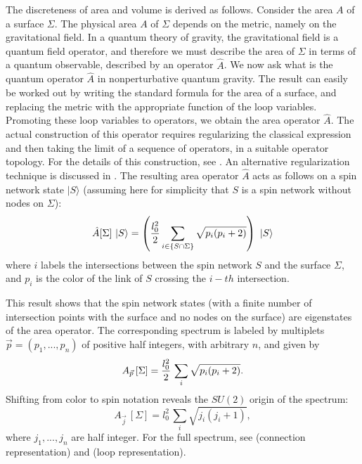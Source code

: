 \documentclass[12pt]{article}
\begin{document}
\begin{itemize}
\begin{itemize}
\end{itemize}

 The discreteness of area and volume is derived as follows.  Consider 
 the area $A$ of a surface $\Sigma$.  The physical area $A$ of 
 $\Sigma$ depends on the metric, namely on the gravitational field.  
 In a quantum theory of gravity, the gravitational field is a quantum 
 field operator, and therefore we must describe the area of $\Sigma$ 
 in terms of a quantum observable, described by an operator $\hat A$.  
 We now ask what is the quantum operator $\hat A$ in nonperturbative 
 quantum gravity.  The result can easily be worked out by writing the 
 standard formula for the area of a surface, and replacing the metric 
 with the appropriate function of the loop variables.  Promoting these 
 loop variables to operators, we obtain the area operator $\hat A$.  
 The actual construction of this operator requires regularizing the 
 classical expression and then taking the limit of a sequence of 
 operators, in a suitable operator topology.  For the details of this 
 construction, see 
 \cite{RovelliSmolin95,DePietriRovelli,FrittelliEtAl,BorissovEtAl97}.  
 An alternative regularization technique is discussed in 
 \cite{AshtekarLewandowskiArea2}.  The resulting area operator $\hat 
 A$ acts as follows on a spin network state $|S\rangle$ (assuming here 
 for simplicity that $S$ is a spin network without nodes on $\Sigma$):
\begin{equation}
\hat{A}[\Sigma]\ |S\rangle=
\left({l^2_0\over 2} \sum_{i\in\{S\cap\Sigma\}}
\sqrt{p_i(p_i+2)}\right) \  |S\rangle
\end{equation}
where $i$ labels the intersections between the spin network $S$ 
and the surface $\Sigma$, and $p_{i}$ is the color of the link of 
$S$ crossing the $i-th$ intersection.

This result shows that the spin network states (with
a finite number of intersection points with the surface
and no nodes on the surface) are eigenstates of the
area operator. The corresponding spectrum is labeled by
multiplets  $\vec p = (p_1, ..., p_n)$ of positive half
integers, with arbitrary $n$, and given by
\begin{equation}
   A_{\vec p}\,[\Sigma] = {l^2_0\over 2} \, \sum_i  
   \sqrt{p_i(p_i+2)}.
\end{equation}
Shifting from color to spin notation reveals the $SU(2)$ origin
of the spectrum:
\begin{equation}
   A_{\vec j}\,[\Sigma] = l^2_0 \, \sum_i  \sqrt{j_i(j_i+1)},
\label{spec}
\end{equation}
where $j_1, ..., j_n$ are half integer.  For the full spectrum, 
see \cite{AshtekarLewandowskiArea2} (connection representation) 
and \cite{FrittelliEtAl} (loop representation).


\end{itemize}
\end{document}
